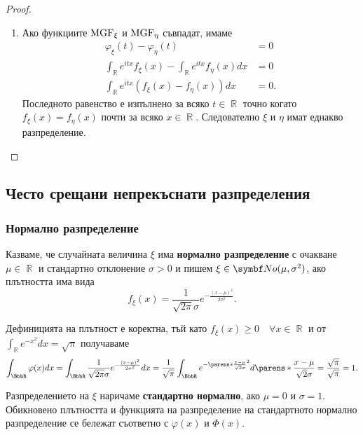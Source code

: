 \documentclass{../../common/topic}
\begin{document}
\begin{proof}
\begin{enumerate}
    \item Ако функциите \( \operatorname{MGF}_\xi \) и \( \operatorname{MGF}_\eta \) съвпадат, имаме
    \begin{align*}
      \varphi_\xi(t) - \varphi_\eta(t) &= 0
      \\
      \int_{\BbbR} e^{itx} f_\xi(x) - \int_{\BbbR} e^{itx} f_\eta(x) dx &= 0
      \\
      \int_{\BbbR} e^{itx} (f_\xi(x) - f_\eta(x)) dx &= 0.
    \end{align*}
    Последното равенство е изпълнено за всяко \( t \in \BbbR \) точно когато \( f_\xi(x) = f_\eta(x) \) почти за всяко \( x \in \BbbR \). Следователно \( \xi \) и \( \eta \) имат еднакво разпределение.
  \end{enumerate}
\end{proof}

\subsection{Често срещани непрекъснати разпределения}

\subsubsection{Нормално разпределение}\label{sec:normal}

\begin{definition}
  Казваме, че случайната величина \( \xi \) има \textbf{нормално разпределение} с очакване \( \mu \in \BbbR \) и стандартно отклонение \( \sigma > 0 \) и пишем \( \xi \in \distr{No}(\mu, \sigma^2) \), ако плътността има вида
  \begin{equation*}
    f_\xi(x) = \frac 1 {\sqrt{2\pi} \sigma} e^{-\frac{{(x-\mu)}^2} {2\sigma^2}}.
  \end{equation*}

  Дефиницията на плътност е коректна, тъй като \( f_\xi(x) \geq 0\quad\forall x \in \BbbR \) и от \( \int_{\BbbR} e^{-x^2} dx = \sqrt \pi \) получаваме
  \begin{equation*}
    \int_{\BbbR} \varphi(x) dx
    =
    \int_{\BbbR} \frac 1 {\sqrt{2\pi} \sigma} e^{-\frac{{(x-\mu)}^2} {2\sigma^2}} dx
    =
    \frac 1 {\sqrt{\pi}} \int_{\BbbR} e^{-{\parens*{\frac {x-\mu} {\sqrt 2 \sigma} }}^2} d\parens*{\frac {x-\mu} {\sqrt 2 \sigma} }
    =
    \frac {\sqrt{\pi}} {\sqrt{\pi}}
    =
    1.
  \end{equation*}

  Разпределението на \( \xi \) наричаме \textbf{стандартно нормално}, ако \( \mu = 0 \) и \( \sigma = 1 \). Обикновено плътността и функцията на разпределение на стандартното нормално разпределение се бележат съответно с \( \varphi(x) \) и \( \Phi(x) \).
\end{definition}
\end{document}
